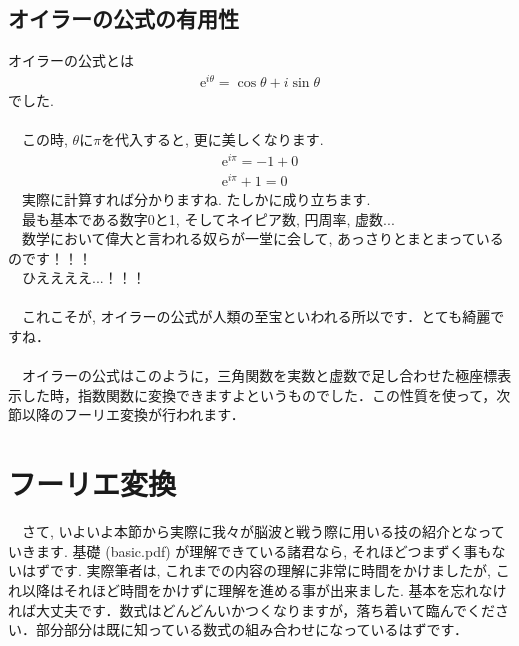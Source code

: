 \documentclass[11pt,a4paper]{ujreport} 	%
\begin{document}
\subsection{オイラーの公式の有用性}
オイラーの公式とは
\begin{eqnarray}
\mathrm{e}^{i\theta} = \cos \theta + i\sin \theta
\end{eqnarray}
でした.\\
\\
　この時, $\theta$に$\pi$を代入すると, 更に美しくなります.
\\
\begin{eqnarray}
\mathrm{e}^{i\pi} = -1 + 0\\
\mathrm{e}^{i\pi} + 1 = 0
\end{eqnarray}
　実際に計算すれば分かりますね. たしかに成り立ちます. \\
　最も基本である数字0と1, そしてネイピア数, 円周率, 虚数...\\
　数学において偉大と言われる奴らが一堂に会して, あっさりとまとまっているのです！！！\\
　ひええええ...！！！\\
\\
　これこそが, オイラーの公式が人類の至宝といわれる所以です．とても綺麗ですね．\\
\\
　オイラーの公式はこのように，三角関数を実数と虚数で足し合わせた極座標表示した時，指数関数に変換できますよというものでした．この性質を使って，次節以降のフーリエ変換が行われます．

\section{フーリエ変換}
　さて, いよいよ本節から実際に我々が脳波と戦う際に用いる技の紹介となっていきます. 基礎 (basic.pdf) が理解できている諸君なら, それほどつまずく事もないはずです. 実際筆者は, これまでの内容の理解に非常に時間をかけましたが, これ以降はそれほど時間をかけずに理解を進める事が出来ました. 基本を忘れなければ大丈夫です．数式はどんどんいかつくなりますが，落ち着いて臨んでください．部分部分は既に知っている数式の組み合わせになっているはずです．
\end{document}

